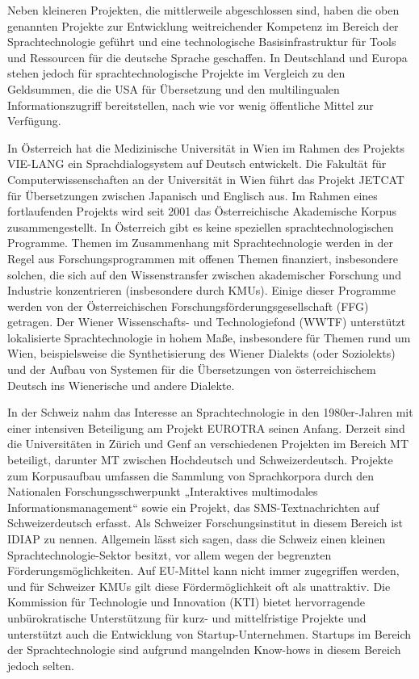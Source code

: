 \documentclass[]{../../metanetpaper}
\begin{document}
\begin{Parallel}[c]{79mm}{78mm}
{Neben kleineren Projekten, die mittlerweile abgeschlossen sind, haben die oben genannten Projekte zur Entwicklung weitreichender Kompetenz im Bereich der Sprachtechnologie geführt und eine technologische Basisinfrastruktur für Tools und Ressourcen für die deutsche Sprache geschaffen. In Deutschland und Europa stehen jedoch für sprachtechnologische Projekte im Vergleich zu den Geldsummen, die die USA für Übersetzung und den multilingualen Informationszugriff bereitstellen, nach wie vor wenig öffentliche Mittel zur Verfügung\cite{laz1}. 

In Österreich hat die Medizinische Universität in Wien im Rahmen des Projekts VIE-LANG ein Sprachdialogsystem auf Deutsch entwickelt. Die Fakultät für Computerwissenschaften an der Universität in Wien führt das Projekt JETCAT für Übersetzungen zwischen Japanisch und Englisch aus. Im Rahmen eines fortlaufenden Projekts wird seit 2001 das Österreichische Akademische Korpus zusammengestellt. In Österreich gibt es keine speziellen sprachtechnologischen Programme. Themen im Zusammenhang mit Sprachtechnologie werden in der Regel aus Forschungsprogrammen mit offenen Themen finanziert, insbesondere solchen, die sich auf den Wissenstransfer zwischen akademischer Forschung und Industrie konzentrieren (insbesondere durch KMUs). Einige dieser Programme werden von der Österreichischen Forschungsförderungsgesellschaft (FFG) getragen. Der Wiener Wissenschafts- und Technologiefond (WWTF) unterstützt lokalisierte Sprachtechnologie in hohem Maße, insbesondere für Themen rund um Wien, beispielsweise die Synthetisierung des Wiener Dialekts (oder Soziolekts) und der Aufbau von Systemen für die Übersetzungen von österreichischem Deutsch ins Wienerische und andere Dialekte. 

In der Schweiz nahm das Interesse an Sprachtechnologie in den 1980er-Jahren mit einer intensiven Beteiligung am Projekt EUROTRA seinen Anfang. Derzeit sind die Universitäten in Zürich und Genf an verschiedenen Projekten im Bereich MT beteiligt, darunter MT zwischen Hochdeutsch und Schweizerdeutsch\cite{latl1}. Projekte zum Korpusaufbau umfassen die Sammlung von Sprachkorpora durch den Nationalen Forschungsschwerpunkt „Interaktives multimodales Informationsmanagement“ sowie ein Projekt, das SMS-Text\-nach\-rich\-ten auf Schweizerdeutsch erfasst\cite{sor1}.  Als Schweizer Forschungsinstitut in diesem Bereich ist IDIAP zu nennen. Allgemein lässt sich sagen, dass die Schweiz einen kleinen Sprachtechnologie-Sektor besitzt, vor allem wegen der begrenzten Förderungsmöglichkeiten. Auf EU-Mittel kann nicht immer zugegriffen werden, und für Schweizer KMUs gilt diese Fördermöglichkeit oft als unattraktiv. Die Kommission für Technologie und Innovation (KTI) bietet hervorragende unbürokratische Unterstützung für kurz- und mittelfristige Projekte und unterstützt auch die Entwicklung von Startup-Unternehmen. Startups im Bereich der Sprachtechnologie sind aufgrund mangelnden Know-hows in diesem Bereich jedoch selten.

}
\end{Parallel}
\end{document}
